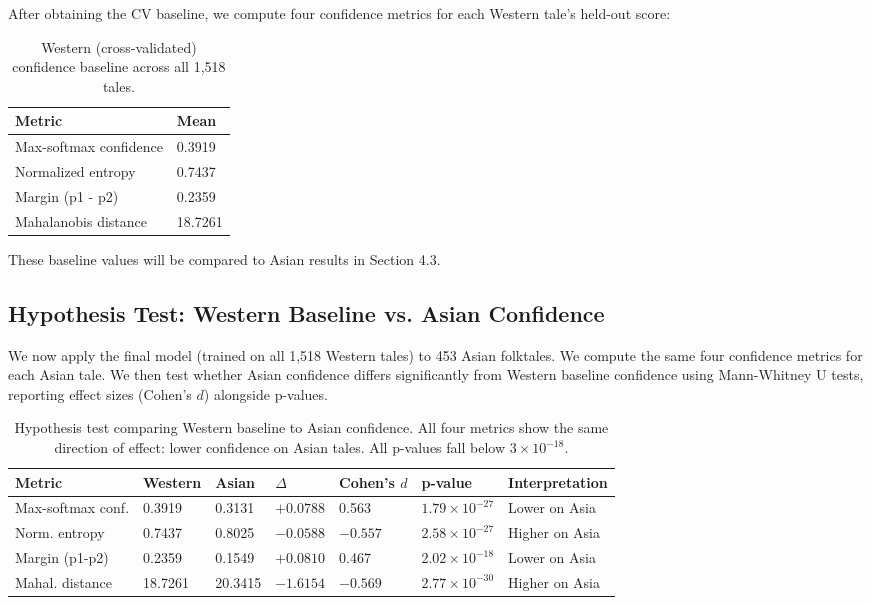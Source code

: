 \documentclass{article}
\begin{document}
After obtaining the CV baseline, we compute four confidence metrics for each Western tale's held-out score:

\begin{table}[h]
\centering
\small
\begin{tabular}{ll}
\toprule
\textbf{Metric} & \textbf{Mean} \\
\midrule
Max-softmax confidence & 0.3919 \\
Normalized entropy & 0.7437 \\
Margin (p1 - p2) & 0.2359 \\
Mahalanobis distance & 18.7261 \\
\bottomrule
\end{tabular}
\caption{Western (cross-validated) confidence baseline across all 1,518 tales.}
\label{tab:western_baseline}
\end{table}

These baseline values will be compared to Asian results in Section 4.3.

\subsection{Hypothesis Test: Western Baseline vs. Asian Confidence}

We now apply the final model (trained on all 1,518 Western tales) to 453 Asian folktales. We compute the same four confidence metrics for each Asian tale. We then test whether Asian confidence differs significantly from Western baseline confidence using Mann-Whitney U tests, reporting effect sizes (Cohen's $d$) alongside p-values.

\begin{table}[h]
\centering
\small
\begin{tabular}{lllllll}
\toprule
\textbf{Metric} & \textbf{Western} & \textbf{Asian} & \textbf{$\Delta$} & \textbf{Cohen's $d$} & \textbf{p-value} & \textbf{Interpretation} \\
\midrule
Max-softmax conf. & 0.3919 & 0.3131 & $+0.0788$ & 0.563 & $1.79 \times 10^{-27}$ & Lower on Asia \\
Norm. entropy & 0.7437 & 0.8025 & $-0.0588$ & $-0.557$ & $2.58 \times 10^{-27}$ & Higher on Asia \\
Margin (p1-p2) & 0.2359 & 0.1549 & $+0.0810$ & 0.467 & $2.02 \times 10^{-18}$ & Lower on Asia \\
Mahal. distance & 18.7261 & 20.3415 & $-1.6154$ & $-0.569$ & $2.77 \times 10^{-30}$ & Higher on Asia \\
\bottomrule
\end{tabular}
\caption{Hypothesis test comparing Western baseline to Asian confidence. All four metrics show the same direction of effect: lower confidence on Asian tales. All p-values fall below $3 \times 10^{-18}$.}
\label{tab:hypothesis_test}
\end{table}
\end{document}

